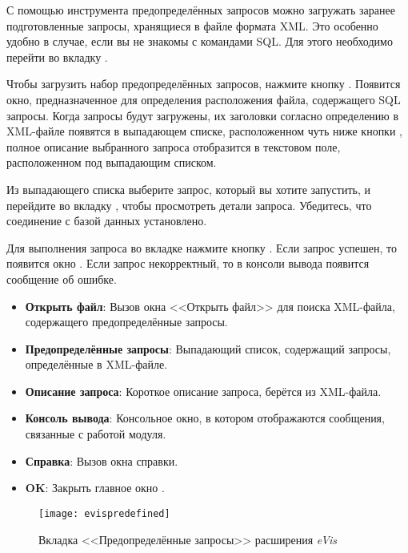 С помощью инструмента предопределённых запросов можно загружать заранее
подготовленные запросы, хранящиеся в файле формата XML. Это особенно удобно
в случае, если вы не знакомы с командами SQL. Для этого необходимо перейти
во вкладку .

Чтобы загрузить набор предопределённых запросов, нажмите кнопку
. Появится окно, предназначенное для
определения расположения файла, содержащего SQL запросы. Когда запросы будут
загружены, их заголовки согласно определению в XML-файле появятся в выпадающем
списке, расположенном чуть ниже кнопки ,
полное описание выбранного запроса отобразится в текстовом поле, расположенном
под выпадающим списком.

Из выпадающего списка выберите запрос, который вы хотите запустить, и перейдите
во вкладку , чтобы просмотреть детали запроса. Убедитесь, что
соединение с базой данных установлено.

Для выполнения запроса во вкладке  нажмите кнопку
. Если запрос успешен, то появится окно .
Если запрос некорректный, то в консоли вывода появится сообщение об ошибке.

\begin{itemize}[label=--]
\item \textbf{Открыть файл}: Вызов окна <<Открыть файл>> для поиска
XML-файла, содержащего предопределённые запросы.
\item \textbf{Предопределённые запросы}: Выпадающий список, содержащий запросы,
определённые в XML-файле.
\item \textbf{Описание запроса}: Короткое описание запроса, берётся из
XML-файла.
\item \textbf{Консоль вывода}: Консольное окно, в котором отображаются
сообщения, связанные с работой модуля.
\item \textbf{Справка}: Вызов окна справки.
\item \textbf{OK}: Закрыть главное окно .
\end{itemize}

\begin{figure}[htp]
   \centering
   \texttt{[image: evispredefined]}
   \caption{\label{evispredefined}Вкладка <<Предопределённые запросы>> расширения
   \emph{eVis} \wincaption}
\end{figure}

\label{evis_xml_format}

